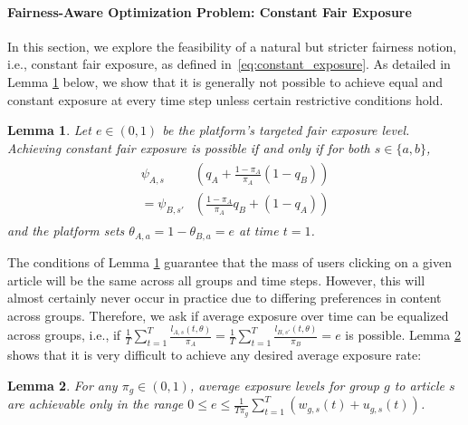 \documentclass[letterpaper]{article} %
\newtheorem{lemma}{Lemma}
\begin{document}
\paragraph{Fairness-Aware Optimization Problem: Constant Fair Exposure}
In this section, we explore the feasibility of a natural but stricter fairness notion, i.e., constant fair exposure, as defined in~\eqref{eq:constant_exposure}.
As detailed in Lemma \ref{lemma:possibility_of_fair_exposure} below, we show that it is generally not possible to achieve  equal and constant exposure at every time step unless certain restrictive conditions hold.

\begin{lemma}\label{lemma:possibility_of_fair_exposure}
Let $e \in (0,1)$ be the platform's targeted fair exposure level.
Achieving constant fair exposure is possible if and only if for both $s\in\{a,b\}$,
\footnotesize
\begin{align}
    \label{eq:condition_equal_constant_exposure}
    \begin{split}
        \psi_{A,s}&\left(q_A  + \frac{1-\pi_A}{\pi_A} (1-q_B) \right) \\
    = \psi_{B,s'}&\left( \frac{1-\pi_A}{\pi_A} q_B  + (1-q_A)\right)
    \end{split}
\end{align}
\normalsize
and the platform sets $\theta_{A,a} = 1-\theta_{B,a}=e $ at time $t=1$.
\end{lemma}

The conditions of Lemma \ref{lemma:possibility_of_fair_exposure} guarantee that the mass of users clicking on a given article will be the same across all groups and time steps.
However, this will almost certainly never occur in practice due to differing preferences in content across groups.
Therefore, we ask if average exposure over time can be equalized across groups, i.e., if $\frac{1}{T}\sum_{t=1}^T\frac{l_{A,s}(t,\theta)}{\pi_A} = \frac{1}{T}\sum_{t=1}^T\frac{l_{B,s'}(t,\theta)}{\pi_B}=e$ is possible.
Lemma \ref{lemma:avg_exp_1group} shows that it is very difficult to achieve any desired average exposure rate:

\begin{lemma} \label{lemma:avg_exp_1group}
For any $\pi_g \in (0,1)$, average exposure levels for group $g$ to article $s$ are achievable only in the range $0 \leq e \leq \frac{1}{T \pi_g} \sum_{t=1}^T \left(w_{g,s}(t) + u_{g,s}(t) \right)$.
\end{lemma}
\end{document}
